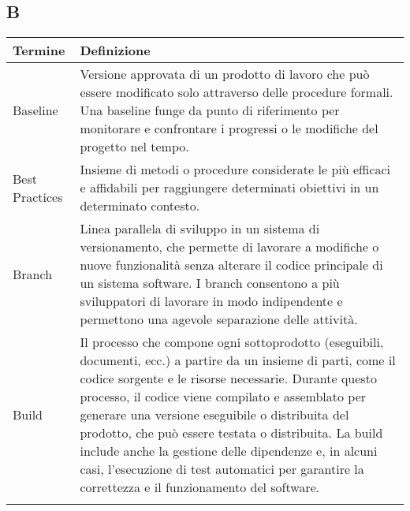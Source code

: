 \documentclass[10pt]{article}
\begin{document}
\subsection{B} %
\begin{tabularx}{\textwidth}{|>{\centering\arraybackslash}l|X|}
\hline
\rowcolor[gray]{0.8}
\textbf{Termine} & \textbf{Definizione}\\
\hline
Baseline & Versione approvata di un prodotto di lavoro che può essere modificato solo attraverso delle procedure formali. Una baseline funge da punto di riferimento per monitorare e confrontare i progressi o le modifiche del progetto nel tempo.\\
\hline
Best Practices & Insieme di metodi o procedure considerate le più efficaci e affidabili per raggiungere determinati obiettivi in un determinato contesto.\\
\hline
Branch & Linea parallela di sviluppo in un sistema di versionamento, che permette di lavorare a modifiche o nuove funzionalità senza alterare il codice principale di un sistema software. I branch consentono a più sviluppatori di lavorare in modo indipendente e permettono una agevole separazione delle attività.\\
\hline
Build & Il processo che compone ogni sottoprodotto (eseguibili, documenti, ecc.) a partire da un insieme di parti, come il codice sorgente e le risorse necessarie. Durante questo processo, il codice viene compilato e assemblato per generare una versione eseguibile o distribuita del prodotto, che può essere testata o distribuita. La build include anche la gestione delle dipendenze e, in alcuni casi, l’esecuzione di test automatici per garantire la correttezza e il funzionamento del software.\\
\hline
 & \\
\hline
\end{tabularx}
\end{document}

